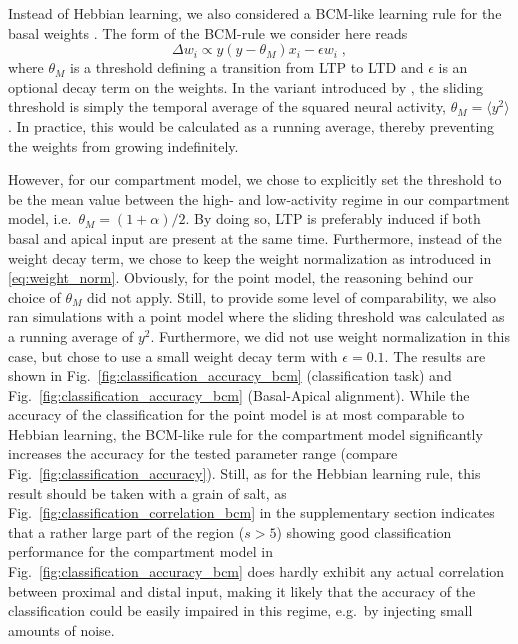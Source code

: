 \documentclass[utf8]{frontiersSCNS} %
\begin{document}
Instead of Hebbian learning, we also considered a BCM-like
learning rule for the basal weights \citep{Bienenstock1982,Intrator1992}.
The form of the BCM-rule we consider here reads
\begin{equation}
\Delta w_i \propto y\left(y - \theta_M\right) x_i - 
\epsilon w_i \; , \label{eq:bcm_rule}
\end{equation}
where $\theta_M$ is a threshold defining a transition from LTP to LTD and
$\epsilon$ is an optional decay term on the weights.
In the variant introduced by \citet{Law1994}, the sliding threshold is simply
the temporal average of the squared neural activity, 
$\theta_M = \langle y^2 \rangle$. In practice, this would be calculated
as a running average, thereby preventing the weights from growing 
indefinitely.

However, for our compartment model, we chose to explicitly set the
threshold to be the mean value between the high- and low-activity regime
in our compartment model, i.e.\ $\theta_M = (1+\alpha)/2$. By doing so, LTP is
preferably induced if both basal and apical input are present at the same
time. Furthermore, instead of the weight decay term, we chose to keep
the weight normalization as introduced in \eqref{eq:weight_norm}.
Obviously, for the point model, the reasoning behind our choice of
$\theta_M$ did not apply. Still, to provide some level of comparability,
we also ran simulations with a point model where the sliding threshold was
calculated as a running average of $y^2$. Furthermore, we did not use
weight normalization in this case, but chose to use a small weight decay term
with $\epsilon = 0.1$. The results are shown in 
Fig.~\ref{fig:classification_accuracy_bcm} (classification task) and 
Fig.~\ref{fig:classification_accuracy_bcm} (Basal-Apical alignment). 
While the accuracy of the classification for the point model
is at most comparable to Hebbian learning, the BCM-like rule for the 
compartment model significantly increases the accuracy for the tested
parameter range (compare Fig.~\ref{fig:classification_accuracy}). 
Still, as for the Hebbian learning rule, this result should be taken
with a grain of salt, as Fig.~\ref{fig:classification_correlation_bcm}
in the supplementary section indicates that a rather large part of 
the region ($s>5$) showing good
classification performance for the compartment model in 
Fig.~\ref{fig:classification_accuracy_bcm} does hardly exhibit any actual
correlation between proximal and distal input, making it likely that
the accuracy of the classification could be easily impaired in this regime, 
e.g.\ by injecting small amounts of noise.
\end{document}
